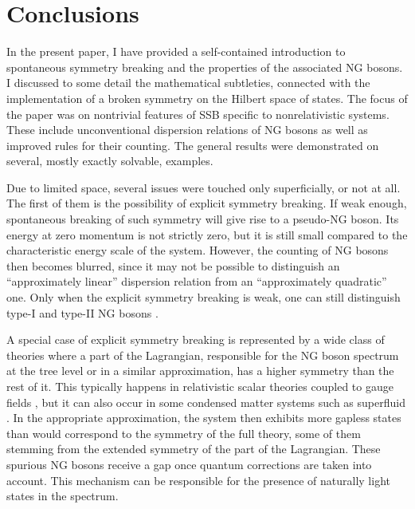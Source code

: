 \documentclass[final,2p,times,12pt,sort&compress]{elsarticle}
\begin{document}

\section{Conclusions}
\label{sec:summary} In the present paper, I have provided a self-contained
introduction to spontaneous symmetry breaking and the properties of the
associated NG bosons. I discussed to some detail the mathematical subtleties,
connected with the implementation of a broken symmetry on the Hilbert space of
states. The focus of the paper was on nontrivial features of SSB specific to
nonrelativistic systems. These include unconventional dispersion relations of
NG bosons as well as improved rules for their counting. The general results
were demonstrated on several, mostly exactly solvable, examples.

Due to limited space, several issues were touched only superficially, or
not at all. The first of them is the possibility of explicit symmetry breaking.
If weak enough, spontaneous breaking of such symmetry will give rise to a
pseudo-NG boson. Its energy at zero momentum is not strictly zero, but it is
still small compared to the characteristic energy scale of the system. However,
the counting of NG bosons then becomes blurred, since it may not be possible to
distinguish an ``approximately linear'' dispersion relation from an
``approximately quadratic'' one. Only when the explicit symmetry breaking is
weak, one can still distinguish type-I and type-II NG bosons
\cite{Brauner:2007uw}.

A special case of explicit symmetry breaking is represented by a wide class of
theories where a part of the Lagrangian, responsible for the NG boson spectrum
at the tree level or in a similar approximation, has a higher symmetry than the
rest of it. This typically happens in relativistic scalar theories coupled to
gauge fields \cite{Weinberg:1972fn,Coleman:1973jx}, but it can also occur in
some condensed matter systems such as superfluid 
\cite{Volovik:1982vo,Volovik:1983vo}. In the appropriate approximation, the
system then exhibits more gapless states than would correspond to the symmetry
of the full theory, some of them stemming from the extended symmetry of the
part of the Lagrangian. These spurious NG bosons receive a gap once quantum
corrections are taken into account. This mechanism can be responsible for the
presence of naturally light states in the spectrum.
\end{document}
